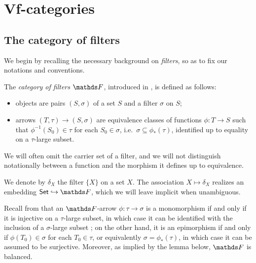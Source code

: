 \section{Vf-categories}

\subsection{The category of filters}

We begin by recalling the necessary background on \emph{filters}, so as to fix our notations and conventions. 


\begin{defn}
    The \emph{category of filters} $\FF$, introduced in \cite{koubekCategoryFilters1970}, is defined as follows:
    \begin{itemize}
        \item objects are pairs $(S, \sigma)$ of a set $S$ and a filter $\sigma$ on $S$;
        \item arrows $(T, \tau) \to (S, \sigma)$ are equivalence classes of functions $\phi \colon T \to S$ such that $\phi^{-1}(S_0) \in \tau $ for each $S_0 \in \sigma$, i.e.\ $\sigma \subseteq \phi_*(\tau)$, identified up to equality on a $\tau$-large subset.
    \end{itemize}
    We will often omit the carrier set of a filter, and we will not distinguish notationally between a function and the morphism it defines up to equivalence.
\end{defn}

We denote by $\delta_X$ the filter $\{X\}$ on a set $X$. The association $X \mapsto \delta_X$ realizes an embedding $\Set \hookrightarrow \FF$, which we will leave implicit when unambiguous.

Recall from \cite[Thm.\ 6]{blassTwoClosedCategories1977} that an $\FF$-arrow $\phi \colon \tau \to \sigma$ is a monomorphism if and only if it is injective on a $\tau$-large subset, in which case it can be identified with the inclusion of a $\sigma$-large subset ; on the other hand, it is an epimorphism if and only if $\phi(T_0) \in \sigma$ for each $T_0 \in \tau$, or equivalently $\sigma = \phi_*(\tau)$, in which case it can be assumed to be surjective. Moreover, as implied by the lemma below, $\FF$ is balanced.

